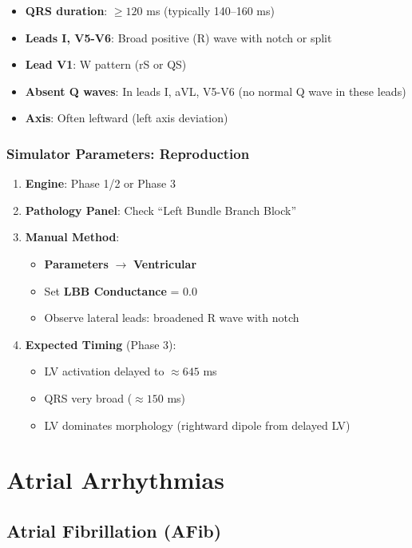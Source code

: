 \documentclass[12pt,a4paper,oneside]{book}
\begin{document}
\begin{itemize}
    \item \textbf{QRS duration}: $\geq 120$ ms (typically 140–160 ms)
    \item \textbf{Leads I, V5-V6}: Broad positive (R) wave with notch or split
    \item \textbf{Lead V1}: W pattern (rS or QS)
    \item \textbf{Absent Q waves}: In leads I, aVL, V5-V6 (no normal Q wave in these leads)
    \item \textbf{Axis}: Often leftward (left axis deviation)
\end{itemize}

\subsubsection{Simulator Parameters: Reproduction}

\begin{enumerate}
    \item \textbf{Engine}: Phase 1/2 or Phase 3
    \item \textbf{Pathology Panel}: Check ``Left Bundle Branch Block''
    \item \textbf{Manual Method}:
    \begin{itemize}
        \item \textbf{Parameters} $\to$ \textbf{Ventricular}
        \item Set \textbf{LBB Conductance} = 0.0
        \item Observe lateral leads: broadened R wave with notch
    \end{itemize}
    \item \textbf{Expected Timing} (Phase 3):
    \begin{itemize}
        \item LV activation delayed to $\approx 645$ ms
        \item QRS very broad ($\approx 150$ ms)
        \item LV dominates morphology (rightward dipole from delayed LV)
    \end{itemize}
\end{enumerate}

\section{Atrial Arrhythmias}

\subsection{Atrial Fibrillation (AFib)}
\end{document}
